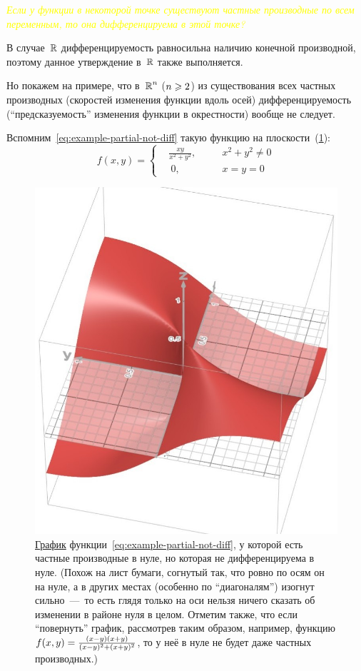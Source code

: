 \documentclass[a4paper,12pt]{article}
\begin{document}
\begin{solution}
    \medskip
    
    \textcolor{yellow}{
      \emph{Если у функции в некоторой точке существуют частные производные по всем переменным, то она дифференцируема в этой точке?
    }}

    В случае~$\operatorname{\mathbb R}$ дифференцируемость равносильна наличию конечной производной, поэтому данное утверждение в~$\operatorname{\mathbb R}$ также выполняется.

    Но покажем на примере, что в~$\operatorname{\mathbb R}^n$ ($n \hm\geq 2$) из существования всех частных производных (скоростей изменения функции вдоль осей) дифференцируемость (``предсказуемость'' изменения функции в окрестности) вообще не следует.

    Вспомним~\eqref{eq:example-partial-not-diff} такую функцию на плоскости~(\ref{fig:paper-list}):
    \[
      f(x, y) = \left\{
        \begin{alignedat}{2}
          &\frac{xy}{x^2 + y^2},\quad & &x^2 + y^2 \not= 0\\
          &\ 0, \quad & &x = y = 0
        \end{alignedat}
      \right.
    \]

    \begin{figure}[ht]
      \centering
      \includegraphics[width=0.4\linewidth]{images/paper-list-cut}
    
      \caption{
        \href{https://www.desmos.com/3d}{График} функции~\eqref{eq:example-partial-not-diff}, у которой есть частные производные в нуле, но которая не дифференцируема в нуле.
        (Похож на лист бумаги, согнутый так, что ровно по осям он на нуле, а в других местах (особенно по ``диагоналям'') изогнут сильно~---~то есть глядя только на оси нельзя ничего сказать об изменении в районе нуля в целом.
        Отметим также, что если ``повернуть'' график, рассмотрев таким образом, например, функцию ${f(x, y) \hm= \frac{(x - y)(x + y)}{(x - y)^2 + (x + y)^2}}$, то у неё в нуле не будет даже частных производных.)
      }
      \label{fig:paper-list}
    \end{figure}


\end{solution}
\end{document}

